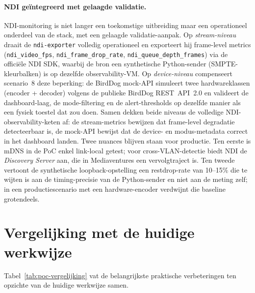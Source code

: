 \paragraph{NDI geïntegreerd met gelaagde validatie.} NDI-monitoring is niet langer een toekomstige uitbreiding maar een operationeel onderdeel van de stack, met een gelaagde validatie-aanpak. Op \emph{stream-niveau} draait de \texttt{ndi-exporter} volledig operationeel en exporteert hij frame-level metrics (\texttt{ndi\_video\_fps}, \texttt{ndi\_frame\_drop\_rate}, \texttt{ndi\_queue\_depth\_frames}) via de officiële NDI SDK, waarbij de bron een synthetische Python-sender (SMPTE-kleurbalken) is op dezelfde observability-VM. Op \emph{device-niveau} compenseert scenario~8 deze beperking: de BirdDog mock-API simuleert twee hardwareklassen (encoder + decoder) volgens de publieke BirdDog REST~API~2.0 en valideert de dashboard-laag, de mode-filtering en de alert-thresholds op dezelfde manier als een fysiek toestel dat zou doen. Samen dekken beide niveaus de volledige NDI-observability-keten af: de stream-metrics bewijzen dat frame-level degradatie detecteerbaar is, de mock-API bewijst dat de device- en modus-metadata correct in het dashboard landen. Twee nuances blijven staan voor productie. Ten eerste is mDNS in de PoC enkel link-local getest; voor cross-VLAN-detectie biedt NDI de \emph{Discovery Server} aan, die in Mediaventures een vervolgtraject is. Ten tweede vertoont de synthetische loopback-opstelling een restdrop-rate van 10--15\% die te wijten is aan de timing-precisie van de Python-sender en niet aan de meting zelf; in een productiescenario met een hardware-encoder verdwijnt die baseline grotendeels.

\section{Vergelijking met de huidige werkwijze}
\label{sec:poc-vergelijking}

Tabel~\ref{tab:poc-vergelijking} vat de belangrijkste praktische verbeteringen ten opzichte van de huidige werkwijze samen.

